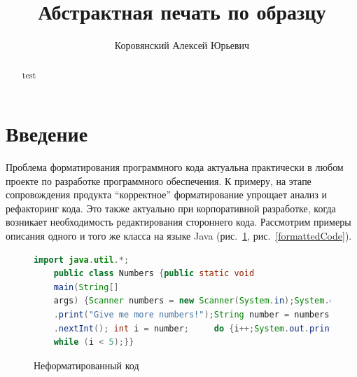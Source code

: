 
\title{Абстрактная печать по образцу}


\author{Коровянский Алексей Юрьевич}



\maketitle             

\begin{abstract}
test
\end{abstract}

\section*{Введение}
Проблема форматирования программного кода актуальна практически в любом проекте по разработке программного обеспечения. К примеру, на этапе сопровождения продукта ``корректное'' форматирование упрощает анализ и рефакторинг кода. Это также актуально при корпоративной разработке, когда возникает необходимость редактирования стороннего кода. Рассмотрим примеры описания одного и того же класса на языке Java (рис.~\ref{uglyCode}, рис.~\ref{formattedCode}).

\setlength{\belowcaptionskip}{-10pt}

\begin{figure}[ht]
  \begin{lstlisting}[language=Java]
    import java.util.*;
    public class Numbers {public static void
    main(String[] 
    args) {Scanner numbers = new Scanner(System.in);System.out
    .print("Give me more numbers!");String number = numbers
    .nextInt(); int i = number;     do {i++;System.out.print(i + " ");} 
    while (i < 5);}}
  \end{lstlisting}
\caption{Неформатированный код}    
\label{uglyCode}
\end{figure}

